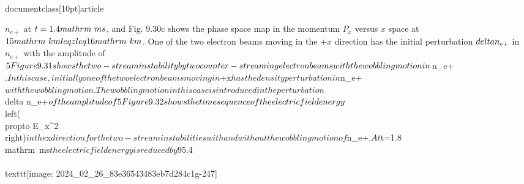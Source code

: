 \\documentclass[10pt]{article}
\begin{document}
{{{{{{$n_{e+}$ at $t=1.4 \\mathrm{~ms}$, and Fig. 9.30c shows the phase space map in the momentum $P_{x}$ versus $x$ space at $15 \\mathrm{~km} \\leq z \\leq 16 \\mathrm{~km}$. One of the two electron beams moving in the $+x$ direction has the initial perturbation $\\delta n_{e+}$ in $n_{e+}$ with the amplitude of $5 \\%

Figure 9.31 shows the two-stream instability by two counter-streaming electron beams with the wobbling motion in $n_{e+}$. In this case, initially one of the two electron beams moving in $+x$ has the density perturbation in $n_{e+}$ with the wobbling motion. The wobbling motion in this case is introduced in the perturbation $\\delta n_{e+}$ of the amplitude of 5\\%

Figure 9.32 shows the time sequence of the electric field energy $\\left(\\propto E_{x}^{2}\\right)$ in the $x$ direction for the two-stream instabilities with and without the wobbling motion of $n_{e+}$. At $t=1.8 \\mathrm{~ms}$ the electric field energy is reduced by $95.4 \\%
\\texttt{[image: 2024\_02\_26\_83e36543483eb7d284c1g-247]}

}}}}}}
\end{document}
